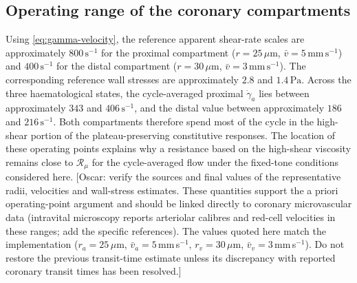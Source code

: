 \documentclass[lineno]{jfm}
\begin{document}
\subsection{Operating range of the coronary compartments}
\label{sec:results-operating-point}
Using \eqref{eq:gamma-velocity}, the reference apparent shear-rate scales are
approximately $800\,\mathrm{s}^{-1}$ for the proximal compartment
($r=25\,\mu\mathrm{m}$, $\bar v=5\,\mathrm{mm\,s^{-1}}$) and
$400\,\mathrm{s}^{-1}$ for the distal compartment
($r=30\,\mu\mathrm{m}$, $\bar v=3\,\mathrm{mm\,s^{-1}}$).
The corresponding reference wall stresses are approximately $2.8$ and
$1.4\,\mathrm{Pa}$.
Across the three haematological states, the cycle-averaged proximal
$\dot{\gamma}_a$ lies between approximately $343$ and
$406\,\mathrm{s}^{-1}$, and the distal value between approximately
$186$ and $216\,\mathrm{s}^{-1}$. Both compartments therefore spend most of
the cycle in the high-shear portion of the plateau-preserving constitutive
responses.
The location of these operating points explains why a resistance based on the
high-shear viscosity remains close to $\mathcal{R}_{\mu}$ for the
cycle-averaged flow under the fixed-tone conditions considered here.
{\color{red}[Oscar: verify the sources and final values of the representative
radii, velocities and wall-stress estimates. These quantities support the
a priori operating-point argument and should be linked directly to coronary
microvascular data (intravital microscopy reports arteriolar calibres and
red-cell velocities in these ranges; add the specific references). The values
quoted here match the implementation
($r_a=25\,\mu$m, $\bar v_a=5$\,mm\,s$^{-1}$, $r_v=30\,\mu$m,
$\bar v_v=3$\,mm\,s$^{-1}$). Do not restore the previous transit-time
estimate unless its discrepancy with reported coronary transit times has been
resolved.]}
\end{document}
